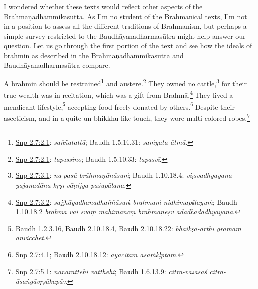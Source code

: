 \documentclass[12pt,openany]{book}%
\begin{document}
I wondered whether these texts would reflect other aspects of the \textsanskrit{Brāhmaṇadhammikasutta}. As I’m no student of the Brahmanical texts, I’m not in a position to assess all the different traditions of Brahmanism, but perhaps a simple survey restricted to the \textsanskrit{Baudhāyanadharmasūtra} might help answer our question. Let us go through the first portion of the text and see how the ideals of brahmin as described in the \textsanskrit{Brāhmaṇadhammikasutta} and \textsanskrit{Baudhāyanadharmasūtra} compare.

A brahmin should be restrained\footnote{\href{https://suttacentral.net/snp2.7/en/sujato\#2.1}{Snp 2.7:2.1}: \textit{\textsanskrit{saññatattā}}; Baudh 1.5.10.31: \textit{\textsanskrit{saṁyata} \textsanskrit{ātmā}}. } and austere.\footnote{\href{https://suttacentral.net/snp2.7/en/sujato\#2.1}{Snp 2.7:2.1}: \textit{tapassino}; Baudh 1.5.10.33: \textit{\textsanskrit{tapasvī}}. } They owned no cattle,\footnote{\href{https://suttacentral.net/snp2.7/en/sujato\#3.1}{Snp 2.7:3.1}: \textit{na \textsanskrit{pasū} \textsanskrit{brāhmaṇānāsuṁ}}; Baudh 1.10.18.4: \textit{\textsanskrit{viṭsvadhyayana}-\textsanskrit{yajanadāna}-\textsanskrit{kṛṣi}-\textsanskrit{vāṇijya}-\textsanskrit{paśupālana}}. } for their true wealth was in recitation, which was a gift from \textsanskrit{Brahmā}.\footnote{\href{https://suttacentral.net/snp2.7/en/sujato\#3.2}{Snp 2.7:3.2}: \textit{\textsanskrit{sajjhāyadhanadhaññāsuṁ} \textsanskrit{brahmaṁ} \textsanskrit{nidhimapālayuṁ}}; Baudh 1.10.18.2 \textit{brahma vai svaṃ \textsanskrit{mahimānaṃ} \textsanskrit{brāhmaṇeṣv} \textsanskrit{adadhādadhyayana}}. } They lived a mendicant lifestyle,\footnote{Baudh 1.2.3.16, Baudh 2.10.18.4, Baudh 2.10.18.22: \textit{\textsanskrit{bhaikṣa}-\textsanskrit{arthī} \textsanskrit{grāmam} anvicchet}. } accepting food freely donated by others.\footnote{\href{https://suttacentral.net/snp2.7/en/sujato\#4.1}{Snp 2.7:4.1}; Baudh 2.10.18.12: \textit{\textsanskrit{ayācitam} \textsanskrit{asaṁkḷptam}}. } Despite their asceticism, and in a quite un-bhikkhu-like touch, they wore multi-colored robes.\footnote{\href{https://suttacentral.net/snp2.7/en/sujato\#5.1}{Snp 2.7:5.1}: \textit{\textsanskrit{nānārattehi} vatthehi}; Baudh 1.6.13.9: \textit{citra-\textsanskrit{vāsasaś} citra-\textsanskrit{āsaṅgāvṛṣākapāv}}. }
\end{document}
